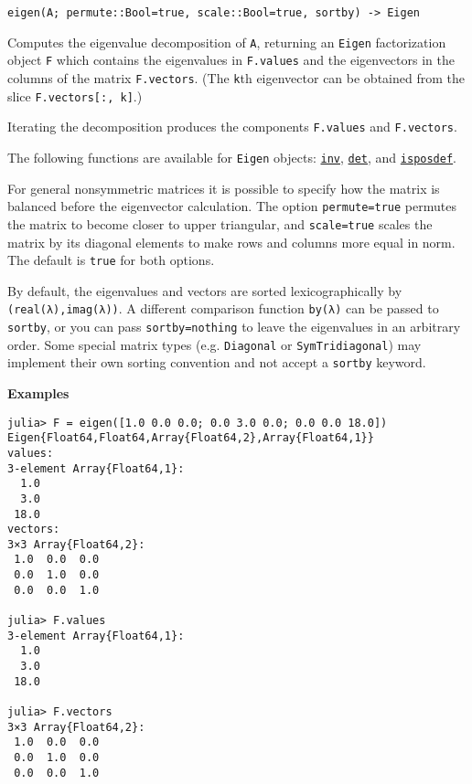\begin{adjustwidth}{2em}{0pt}


\begin{verbatim}
eigen(A; permute::Bool=true, scale::Bool=true, sortby) -> Eigen
\end{verbatim}

Computes the eigenvalue decomposition of \texttt{A}, returning an \texttt{Eigen} factorization object \texttt{F} which contains the eigenvalues in \texttt{F.values} and the eigenvectors in the columns of the matrix \texttt{F.vectors}. (The \texttt{k}th eigenvector can be obtained from the slice \texttt{F.vectors[:, k]}.)

Iterating the decomposition produces the components \texttt{F.values} and \texttt{F.vectors}.

The following functions are available for \texttt{Eigen} objects: \hyperlink{13336866048543706848}{\texttt{inv}}, \hyperlink{16543378577000914469}{\texttt{det}}, and \hyperlink{13841568437070319804}{\texttt{isposdef}}.

For general nonsymmetric matrices it is possible to specify how the matrix is balanced before the eigenvector calculation. The option \texttt{permute=true} permutes the matrix to become closer to upper triangular, and \texttt{scale=true} scales the matrix by its diagonal elements to make rows and columns more equal in norm. The default is \texttt{true} for both options.

By default, the eigenvalues and vectors are sorted lexicographically by \texttt{(real(λ),imag(λ))}. A different comparison function \texttt{by(λ)} can be passed to \texttt{sortby}, or you can pass \texttt{sortby=nothing} to leave the eigenvalues in an arbitrary order.   Some special matrix types (e.g. \texttt{Diagonal} or \texttt{SymTridiagonal}) may implement their own sorting convention and not accept a \texttt{sortby} keyword.

\textbf{Examples}


\begin{verbatim}
julia> F = eigen([1.0 0.0 0.0; 0.0 3.0 0.0; 0.0 0.0 18.0])
Eigen{Float64,Float64,Array{Float64,2},Array{Float64,1}}
values:
3-element Array{Float64,1}:
  1.0
  3.0
 18.0
vectors:
3×3 Array{Float64,2}:
 1.0  0.0  0.0
 0.0  1.0  0.0
 0.0  0.0  1.0

julia> F.values
3-element Array{Float64,1}:
  1.0
  3.0
 18.0

julia> F.vectors
3×3 Array{Float64,2}:
 1.0  0.0  0.0
 0.0  1.0  0.0
 0.0  0.0  1.0


\end{verbatim}
\end{adjustwidth}
